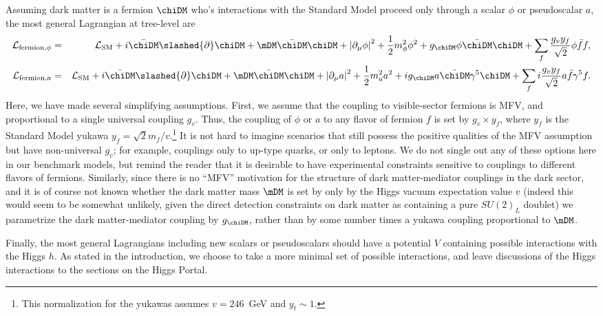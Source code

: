 Assuming dark matter is a fermion $\chiDM$ who's interactions with the Standard Model proceed only through a scalar $\phi$ or pseudoscalar $a$, the most general Lagrangian at tree-level are
\begin{eqnarray}
{\cal L}_{{\rm fermion},\phi} & = & {\cal L}_{\rm SM}+i\bar{\chiDM} \slashed{\partial} \chiDM + \mDM \bar{\chiDM}\chiDM + \left| \partial_\mu \phi \right|^2+\frac{1}{2}m_\phi^2 \phi^2 + g_\chiDM \phi \bar{\chiDM}\chiDM+ \sum_f \frac{g_v y_f}{\sqrt{2}} \phi \bar{f} f, \label{eq:scalarlag} \\
{\cal L}_{{\rm fermion},a} & = & {\cal L}_{\rm SM}+i\bar{\chiDM} \slashed{\partial} \chiDM + \mDM \bar{\chiDM}\chiDM + \left| \partial_\mu a \right|^2+\frac{1}{2}m_a^2 a^2 + i g_\chiDM a \bar{\chiDM}\gamma^5 \chiDM+ \sum_f i \frac{g_v y_f}{\sqrt{2}} a \bar{f}\gamma^5 f. \label{eq:pseudoscalarlag}
\end{eqnarray}
Here, we have made several simplifying assumptions. First, we assume that the coupling to visible-sector fermions is MFV, and proportional to a single universal coupling $g_v$. Thus, the coupling of $\phi$ or $a$ to any flavor of fermion $f$ is set by $g_v \times y_f$, where $y_f$ is the Standard Model yukawa $y_f = \sqrt{2}m_f/v$.\footnote{This normalization for the yukawas assumes $v = 246$~GeV and $y_t \sim 1$.} It is not hard to imagine scenarios that still possess the positive qualities of the MFV assumption but have non-universal $g_v$; for example, couplings only to up-type quarks, or only to leptons. We do not single out any of these options here in our benchmark models, but remind the reader that it is desirable to have experimental constraints sensitive to couplings to different flavors of fermions. Similarly, since there is no ``MFV'' motivation for the structure of dark matter-mediator couplings in the dark sector, and it is of course not known whether the dark matter mass $\mDM$ is set by only by the Higgs vacuum expectation value $v$ (indeed this would seem to be somewhat unlikely, given the direct detection constraints on dark matter as containing a pure $SU(2)_L$ doublet) we parametrize the dark matter-mediator coupling by $g_\chiDM$, rather than by some number times a yukawa coupling proportional to $\mDM$. 

Finally, the most general Lagrangians including new scalars or pseudoscalars should have a potential $V$ containing possible interactions with the Higgs $h$. As stated in the introduction, we choose to take a more minimal set of possible interactions, and leave discussions of the Higgs interactions to the sections on the Higgs Portal.

